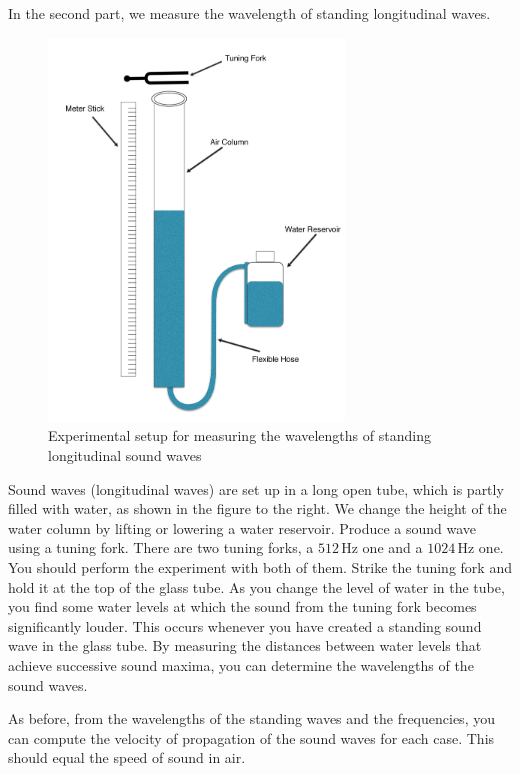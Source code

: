 In the second part, we measure the wavelength of standing longitudinal waves.
\begin{figure}[h]
\centering
\includegraphics[width=0.7\textwidth]{./Exp1-9/pic/page03.jpg}
\caption{Experimental setup for measuring the wavelengths of standing longitudinal sound waves}
\end{figure}

Sound waves (longitudinal waves) are set up in a long open tube, which is partly filled with water, as shown in the figure to the right. We change the height of the water column by lifting or lowering a water reservoir. Produce a sound wave using a tuning fork. There are two tuning forks, a $512\, \textrm{Hz}$ one and a $1024\, \textrm{Hz}$ one. You should perform the experiment with both of them. Strike the tuning fork and hold it at the top of the glass tube. As you change the level of water in the tube, you find some water levels at which the sound from the tuning fork becomes significantly louder. This occurs whenever you have created a standing sound wave in the glass tube. By measuring the distances between water levels that achieve successive sound maxima, you can determine the wavelengths of the sound waves. \myskip

As before, from the wavelengths of the standing waves and the frequencies, you can compute the velocity of propagation of the sound waves for each case. This should equal the speed of sound in air.\myskip

